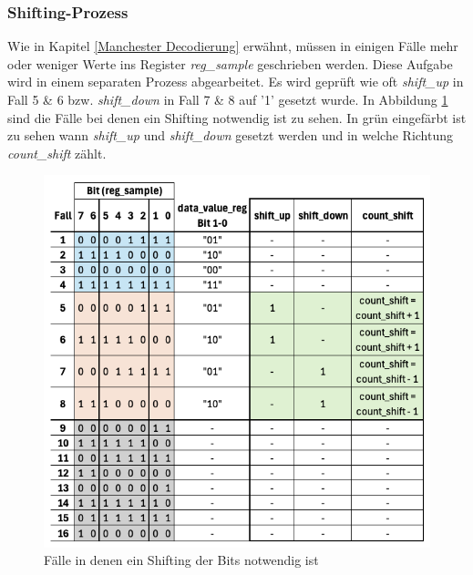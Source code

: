 \newpage

\subsubsection{Shifting-Prozess}
\label{Shifting-Prozess}
Wie in Kapitel \ref{Manchester Decodierung} erwähnt, müssen in einigen Fälle mehr oder weniger
Werte ins Register \textit{reg\_sample} geschrieben werden. Diese Aufgabe wird in einem
separaten Prozess abgearbeitet. Es wird geprüft wie oft \textit{shift\_up} in Fall 5 \& 6 bzw. \textit{shift\_down} in Fall 7 \& 8 auf '1' gesetzt wurde.
In Abbildung \ref{fig:FPGAShiftingCases} sind die Fälle bei denen ein Shifting notwendig ist
zu sehen. In grün eingefärbt ist zu sehen wann \textit{shift\_up} und \textit{shift\_down}
gesetzt werden und in welche Richtung \textit{count\_shift} zählt.

\begin{figure}[H]
    \centering
    \includegraphics[width=0.9\linewidth]{Figures//Chap3//FPGA/FPGA_Shifting.png}
    \caption{Fälle in denen ein Shifting der Bits notwendig ist}
    \label{fig:FPGAShiftingCases}
\end{figure}

